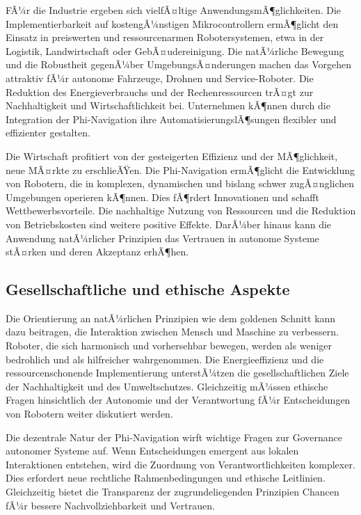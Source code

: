 ﻿\documentclass[a4paper,12pt]{article}
\theoremstyle{definition}
\begin{document}
FÃ¼r die Industrie ergeben sich vielfÃ¤ltige AnwendungsmÃ¶glichkeiten. Die Implementierbarkeit auf kostengÃ¼nstigen Mikrocontrollern ermÃ¶glicht den Einsatz in preiswerten und ressourcenarmen Robotersystemen, etwa in der Logistik, Landwirtschaft oder GebÃ¤udereinigung. Die natÃ¼rliche Bewegung und die Robustheit gegenÃ¼ber UmgebungsÃ¤nderungen machen das Vorgehen attraktiv fÃ¼r autonome Fahrzeuge, Drohnen und Service-Roboter. Die Reduktion des Energieverbrauchs und der Rechenressourcen trÃ¤gt zur Nachhaltigkeit und Wirtschaftlichkeit bei. Unternehmen kÃ¶nnen durch die Integration der Phi-Navigation ihre AutomatisierungslÃ¶sungen flexibler und effizienter gestalten.

Die Wirtschaft profitiert von der gesteigerten Effizienz und der MÃ¶glichkeit, neue MÃ¤rkte zu erschlieÃŸen. Die Phi-Navigation ermÃ¶glicht die Entwicklung von Robotern, die in komplexen, dynamischen und bislang schwer zugÃ¤nglichen Umgebungen operieren kÃ¶nnen. Dies fÃ¶rdert Innovationen und schafft Wettbewerbsvorteile. Die nachhaltige Nutzung von Ressourcen und die Reduktion von Betriebskosten sind weitere positive Effekte. DarÃ¼ber hinaus kann die Anwendung natÃ¼rlicher Prinzipien das Vertrauen in autonome Systeme stÃ¤rken und deren Akzeptanz erhÃ¶hen.

\subsection{Gesellschaftliche und ethische Aspekte}

Die Orientierung an natÃ¼rlichen Prinzipien wie dem goldenen Schnitt kann dazu beitragen, die Interaktion zwischen Mensch und Maschine zu verbessern. Roboter, die sich harmonisch und vorhersehbar bewegen, werden als weniger bedrohlich und als hilfreicher wahrgenommen. Die Energieeffizienz und die ressourcenschonende Implementierung unterstÃ¼tzen die gesellschaftlichen Ziele der Nachhaltigkeit und des Umweltschutzes. Gleichzeitig mÃ¼ssen ethische Fragen hinsichtlich der Autonomie und der Verantwortung fÃ¼r Entscheidungen von Robotern weiter diskutiert werden.

Die dezentrale Natur der Phi-Navigation wirft wichtige Fragen zur Governance autonomer Systeme auf. Wenn Entscheidungen emergent aus lokalen Interaktionen entstehen, wird die Zuordnung von Verantwortlichkeiten komplexer. Dies erfordert neue rechtliche Rahmenbedingungen und ethische Leitlinien. Gleichzeitig bietet die Transparenz der zugrundeliegenden Prinzipien Chancen fÃ¼r bessere Nachvollziehbarkeit und Vertrauen.
\end{document}
